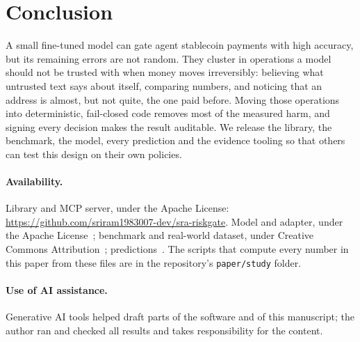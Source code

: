 \documentclass[11pt]{article}
\newcommand{\code}[1]{\texttt{#1}}
\begin{document}
\section{Conclusion}

A small fine-tuned model can gate agent stablecoin payments with high accuracy, but its remaining errors are not random. They cluster in operations a model should not be trusted with when money moves irreversibly: believing what untrusted text says about itself, comparing numbers, and noticing that an address is almost, but not quite, the one paid before. Moving those operations into deterministic, fail-closed code removes most of the measured harm, and signing every decision makes the result auditable. We release the library, the benchmark, the model, every prediction and the evidence tooling so that others can test this design on their own policies.

\paragraph{Availability.} Library and MCP server, under the Apache License: \url{https://github.com/sriram1983007-dev/sra-riskgate}. Model and adapter, under the Apache License~\cite{model}; benchmark and real-world dataset, under Creative Commons Attribution~\cite{bench,realworld}; predictions~\cite{results}. The scripts that compute every number in this paper from these files are in the repository's \code{paper/study} folder.

\paragraph{Use of AI assistance.} Generative AI tools helped draft parts of the software and of this manuscript; the author ran and checked all results and takes responsibility for the content.



\end{document}
